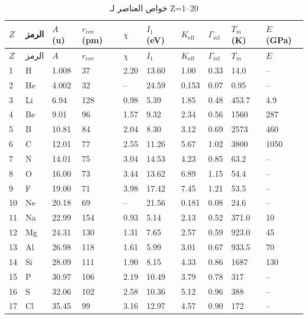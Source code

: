 \documentclass[11pt,a4paper]{article}
\newcommand{\Keff}{K_{\mathrm{eff}}}
\begin{document}
\begin{otherlanguage}{arabic}
		\begin{longtable}{p{0.6cm}p{1.2cm}p{1.2cm}p{1.2cm}p{1.2cm}p{1.2cm}p{1.5cm}p{1.2cm}p{1.2cm}p{1.2cm}}
			\caption{خواص العناصر لـ Z=1–20} \label{tab:elem-data-first20} \\
			\toprule
			\(Z\) & الرمز & \(A\) (u) & \(r_{\text{cov}}\) (pm) & \(\chi\) & \(I_1\) (eV) & \(\Keff\) & \(\Gamma_{\text{rel}}\) & \(T_m\) (K) & \(E\) (GPa) \\
			\midrule
			\endfirsthead
			\toprule
			\(Z\) & الرمز & \(A\) & \(r_{\text{cov}}\) & \(\chi\) & \(I_1\) & \(\Keff\) & \(\Gamma_{\text{rel}}\) & \(T_m\) & \(E\) \\
			\midrule
			\endhead
			1  & H  & 1.008  & 37   & 2.20 & 13.60 & 1.00  & 0.33  & 14.0  & – \\
			2  & He & 4.002  & 32   & –    & 24.59 & 0.153 & 0.07  & 0.95  & – \\
			3  & Li & 6.94   & 128  & 0.98 & 5.39  & 1.85  & 0.48  & 453.7 & 4.9 \\
			4  & Be & 9.01   & 96   & 1.57 & 9.32  & 2.34  & 0.56  & 1560  & 287 \\
			5  & B  & 10.81  & 84   & 2.04 & 8.30  & 3.12  & 0.69  & 2573  & 460\footnotemark \\
			6  & C  & 12.01  & 77   & 2.55 & 11.26 & 5.67  & 1.02  & 3800  & 1050\footnotemark \\
			7  & N  & 14.01  & 75   & 3.04 & 14.53 & 4.23  & 0.85  & 63.2  & – \\
			8  & O  & 16.00  & 73   & 3.44 & 13.62 & 6.89  & 1.15  & 54.4  & – \\
			9  & F  & 19.00  & 71   & 3.98 & 17.42 & 7.45  & 1.21  & 53.5  & – \\
			10 & Ne & 20.18  & 69   & –    & 21.56 & 0.181 & 0.08  & 24.6  & – \\
			11 & Na & 22.99  & 154  & 0.93 & 5.14  & 2.13  & 0.52  & 371.0 & 10 \\
			12 & Mg & 24.31  & 130  & 1.31 & 7.65  & 2.57  & 0.59  & 923.0 & 45 \\
			13 & Al & 26.98  & 118  & 1.61 & 5.99  & 3.01  & 0.67  & 933.5 & 70 \\
			14 & Si & 28.09  & 111  & 1.90 & 8.15  & 4.33  & 0.86  & 1687  & 130 \\
			15 & P  & 30.97  & 106  & 2.19 & 10.49 & 3.79  & 0.78  & 317   & – \\
			16 & S  & 32.06  & 102  & 2.58 & 10.36 & 5.12  & 0.96  & 388   & – \\
			17 & Cl & 35.45  & 99   & 3.16 & 12.97 & 4.57  & 0.90  & 172   & – \\

\end{longtable}
\end{otherlanguage}
\end{document}
